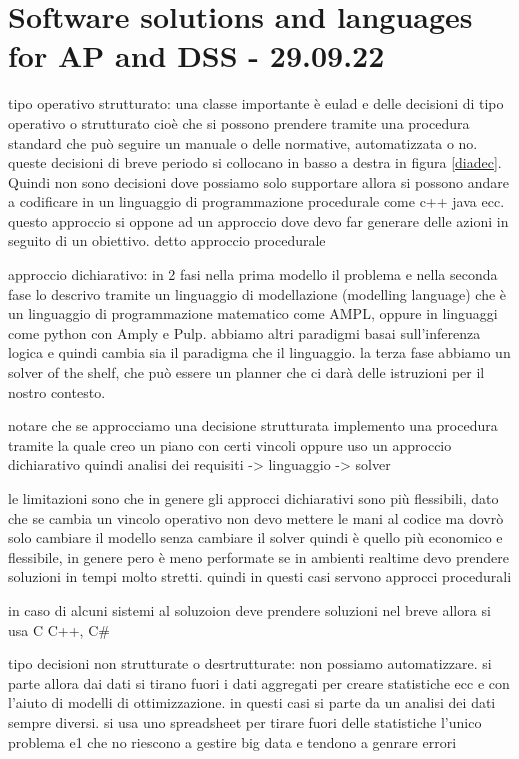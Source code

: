 
\section{Software solutions and languages for AP and DSS - 29.09.22}


tipo operativo strutturato:
una classe importante è eulad e delle decisioni di tipo operativo o strutturato cioè che si possono prendere tramite una procedura standard che può seguire un manuale o delle normative, automatizzata o no. queste decisioni di breve periodo si collocano in basso a destra in figura  \ref{diadec}. Quindi non sono decisioni dove possiamo solo supportare allora si possono andare a codificare in un linguaggio di programmazione procedurale come c++ java ecc. questo approccio si oppone ad un approccio dove devo far generare delle azioni in seguito di un obiettivo. detto approccio procedurale

approccio dichiarativo: in 2 fasi nella prima modello il problema e nella seconda fase lo descrivo tramite un linguaggio di modellazione (modelling language) che è un linguaggio di programmazione matematico come AMPL, oppure in linguaggi come python con Amply e Pulp. abbiamo altri paradigmi basai sull'inferenza logica e quindi cambia sia il paradigma che il linguaggio. la terza fase abbiamo un solver of the shelf, che può essere un planner che ci darà delle istruzioni per il nostro contesto.

notare che se approcciamo una decisione strutturata implemento una procedura tramite la quale creo un piano con certi vincoli oppure uso un approccio dichiarativo quindi analisi dei requisiti -> linguaggio ->  solver


le limitazioni sono che in genere gli approcci dichiarativi sono più flessibili, dato che se cambia un vincolo operativo non devo mettere le mani al codice ma dovrò solo cambiare il modello senza cambiare il solver quindi è quello più economico e flessibile, in genere pero è meno performate se in ambienti realtime devo prendere soluzioni in tempi molto stretti. quindi in questi casi servono approcci procedurali

in caso di alcuni sistemi al soluzoion deve prendere soluzioni nel breve allora si usa C C++, C#



tipo decisioni non strutturate o desrtrutturate: non possiamo automatizzare. si parte allora dai dati si tirano fuori i dati aggregati per creare statistiche ecc e con l'aiuto di modelli di ottimizzazione. in questi casi si parte da un analisi dei dati sempre diversi. si usa uno spreadsheet per tirare fuori delle statistiche l'unico problema e1 che no riescono a gestire big data e tendono a genrare errori


